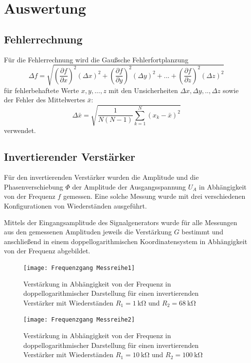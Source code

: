 \newpage
\section{Auswertung}
\label{sec:Auswertung}
\subsection{Fehlerrechnung}
Für die Fehlerrechnung wird die Gaußsche Fehlerfortplanzung
\begin{equation}
\Delta f=\sqrt{\left(\frac{\partial f}{\partial x}\right)^2(\Delta x)^2+\left(\frac{\partial f}{\partial y}\right)^2(\Delta y)^2+...+\left(\frac{\partial f}{\partial z}\right)^2(\Delta z)^2}
\end{equation}
für fehlerbehaftete Werte $x,y,...,z$ mit den Unsicherheiten $\Delta x,\Delta y,..,\Delta z$ sowie der Fehler des Mittelwertes $\bar{x}$:
\begin{equation}
\Delta \bar{x}=\sqrt{\frac{1}{N(N-1)}\sum_{k=1}^N(x_k-\bar{x})^2}
\end{equation}
verwendet.
\subsection{Invertierender Verstärker}
Für den invertierenden Verstärker wurden die Amplitude und die Phasenverschiebung $\Phi$ der Amplitude der Ausgangsspannung $U_A$ in Abhängigkeit von der Frequenz $f$ gemessen. Eine solche Messung wurde mit drei verschiedenen Konfigurationen von Wiederständen ausgeführt.

Mittels der Eingangsamplitude des Signalgenerators wurde für alle Messungen aus den gemessenen Amplituden jeweils die Verstärkung $G$ bestimmt und anschließend in einem doppellogarithmischen Koordinatensystem in Abhängigkeit von der Frequenz abgebildet.
\begin{figure}
\centering
\texttt{[image: Frequenzgang Messreihe1]}
\caption{Verstärkung in Abhängigkeit von der Frequenz in doppellogarithmischer Darstellung für einen invertierenden Verstärker mit Wiederständen $R_1=\SI{1}{\kilo\ohm}$ und $R_2=\SI{68}{\kilo\ohm}$}
\label{fig:invert_freq_1}
\end{figure}

\begin{figure}
\centering
\texttt{[image: Frequenzgang Messreihe2]}
\caption{Verstärkung in Abhängigkeit von der Frequenz in doppellogarithmischer Darstellung für einen invertierenden Verstärker mit Wiederständen $R_1=\SI{10}{\kilo\ohm}$ und $R_2=\SI{100}{\kilo\ohm}$}
\label{fig:invert_freq_2}
\end{figure}

